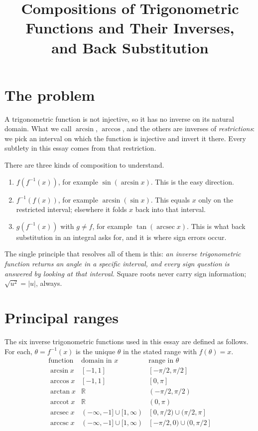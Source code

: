 \documentclass{essay}
\title{Compositions of Trigonometric Functions and Their Inverses,\\
and Back Substitution}
\author{}
\date{}
\DeclareMathOperator{\arcsec}{arcsec}
\DeclareMathOperator{\arccsc}{arccsc}
\DeclareMathOperator{\arccot}{arccot}
\begin{document}
\maketitle

\section{The problem}

A trigonometric function is not injective, so it has no inverse on its
natural domain. What we call $\arcsin$, $\arccos$, and the others are
inverses of \emph{restrictions}: we pick an interval on which the function
is injective and invert it there. Every subtlety in this essay comes from
that restriction.

There are three kinds of composition to understand.
\begin{enumerate}
  \item $f(f^{-1}(x))$, for example $\sin(\arcsin x)$. This is the easy
        direction.
  \item $f^{-1}(f(x))$, for example $\arcsin(\sin x)$. This equals $x$
        only on the restricted interval; elsewhere it folds $x$ back into
        that interval.
  \item $g(f^{-1}(x))$ with $g \ne f$, for example $\tan(\arcsec x)$.
        This is what back substitution in an integral asks for, and it is
        where sign errors occur.
\end{enumerate}

The single principle that resolves all of them is this: \emph{an inverse
trigonometric function returns an angle in a specific interval, and every
sign question is answered by looking at that interval.} Square roots never
carry sign information; $\sqrt{u^2} = |u|$, always.

\section{Principal ranges}

\begin{definition}
The six inverse trigonometric functions used in this essay are defined as
follows. For each, $\theta = f^{-1}(x)$ is the unique $\theta$ in the stated
range with $f(\theta) = x$.
\[
\begin{array}{lll}
\text{function} & \text{domain in } x & \text{range in } \theta \\[2pt]
\hline
\arcsin x & [-1, 1] & [-\pi/2, \pi/2] \\
\arccos x & [-1, 1] & [0, \pi] \\
\arctan x & \mathbb{R} & (-\pi/2, \pi/2) \\
\arccot x & \mathbb{R} & (0, \pi) \\
\arcsec x & (-\infty, -1] \cup [1, \infty) & [0, \pi/2) \cup (\pi/2, \pi] \\
\arccsc x & (-\infty, -1] \cup [1, \infty) & [-\pi/2, 0) \cup (0, \pi/2]
\end{array}
\]
\end{definition}
\end{document}
